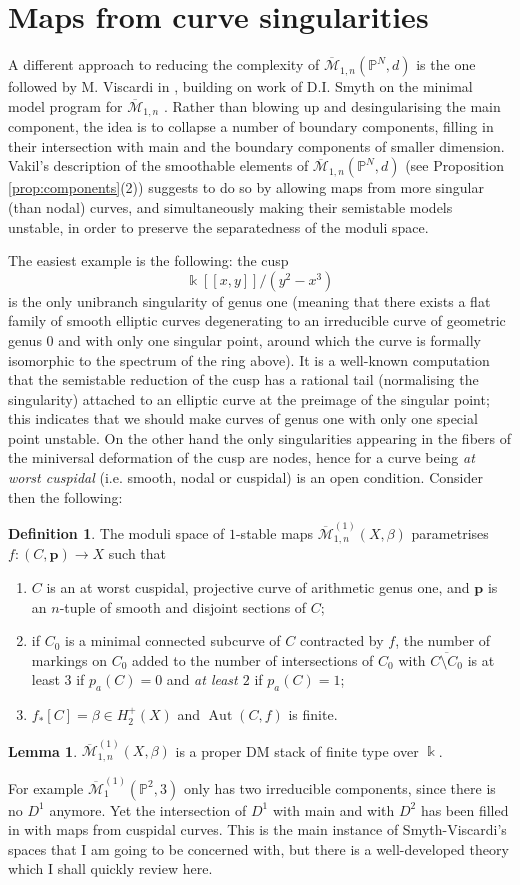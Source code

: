 \documentclass[11pt]{amsart}
\newcommand{\pazocal}{\mathcal}
\newcommand{\oM}{\overline{\mathcal{M}}}
\newcommand{\M}[4]{\overline{\mathcal{M}}_{#1,#2}(#3,#4)}
\newcommand{\Mone}[3]{\overline{\pazocal M}^{(1)}_{1,#1}(#2,#3)}
\newcommand{\PP}{\mathbb P}
\renewcommand{\to}{\rightarrow}
\newcommand{\kk}{\Bbbk}
\newcommand{\Aut}{\operatorname{Aut}}
\theoremstyle{definition}
\newtheorem{lemma}[thm]{Lemma}
\theoremstyle{definition}
\newtheorem{dfn}[thm]{Definition}
\begin{document}
\section{Maps from curve singularities}
A different approach to reducing the complexity of $\M{1}{n}{\PP^N}{d}$ is the one followed by M. Viscardi in \cite{VISC}, building on work of D.I. Smyth on the minimal model program for $\oM_{1,n}$ \cite{SMY1}. Rather than blowing up and desingularising the main component, the idea is to collapse a number of boundary components, filling in their intersection with main and the boundary components of smaller dimension. Vakil's description of the smoothable elements of $\M{1}{n}{\PP^N}{d}$ (see Proposition \ref{prop:components}(2)) suggests to do so by allowing maps from more singular (than nodal) curves, and simultaneously making their semistable models unstable, in order to preserve the separatedness of the moduli space.

The easiest example is the following: the cusp
\[\kk[\![x,y]\!]/(y^2-x^3)\]
is the only unibranch singularity of genus one (meaning that there exists a flat family of smooth elliptic curves degenerating to an irreducible curve of geometric genus $0$ and with only one singular point, around which the curve is formally isomorphic to the spectrum of the ring above). It is a well-known computation \cite[\S 3.C]{HM} that the semistable reduction of the cusp has a rational tail (normalising the singularity) attached to an elliptic curve at the preimage of the singular point; this indicates that we should make curves of genus one with only one special point unstable. On the other hand the only singularities appearing in the fibers of the miniversal deformation of the cusp are nodes, hence for a curve being \emph{at worst cuspidal} (i.e. smooth, nodal or cuspidal) is an open condition. Consider then the following:
\begin{dfn}
 The moduli space of $1$-stable maps $\Mone{n}{X}{\beta}$ parametrises $f\colon (C,\mathbf p)\to X$ such that
 \begin{enumerate}
  \item $C$ is an at worst cuspidal, projective curve of arithmetic genus one, and $\mathbf p$ is an $n$-tuple of smooth and disjoint sections of $C$;
  \item if $C_0$ is a minimal connected subcurve of $C$ contracted by $f$, the number of markings on $C_0$ added to the number of intersections of $C_0$ with $\overline{C\setminus C_0}$ is at least $3$ if $p_a(C)=0$ and \emph{at least $2$} if $p_a(C)=1$;
  \item $f_*[C]=\beta\in H^+_2(X)$ and $\Aut(C,f)$ is finite.
 \end{enumerate}
\end{dfn}
\begin{lemma}
 $\Mone{n}{X}{\beta}$ is a proper DM stack of finite type over $\kk$.
\end{lemma}
For example $\oM^{(1)}_1(\PP^2,3)$ only has two irreducible components, since there is no $D^1$ anymore. Yet the intersection of $D^1$ with main and with $D^2$ has been filled in with maps from cuspidal curves. This is the main instance of Smyth-Viscardi's spaces that I am going to be concerned with, but there is a well-developed theory which I shall quickly review here.
\end{document}
